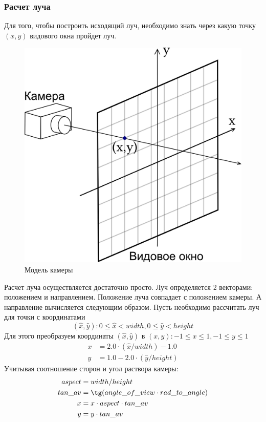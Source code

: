 \documentclass[12pt, a4paper, utf8]{article}
\begin{document}
\subsubsection{Расчет луча}

Для того, чтобы построить исходящий луч, необходимо знать через какую точку $(x,y)$ видового окна пройдет луч.

\begin{figure}[H]
\centering
\includegraphics[scale=0.75]{imgs/camera.png} 
\caption{Модель камеры}\label{fig:camera_model}
\end{figure}

Расчет луча осуществляется достаточно просто. Луч определяется 2 векторами: положением и направлением. Положение луча совпадает с положением камеры. А направление вычисляется следующим образом.
Пусть необходимо рассчитать луч для точки с координатами
$$(\hat x, \hat y) : 0 \le \hat x < width, 0 \le \hat y < height$$
Для этого преобразуем координаты $(\hat x, \hat y)$ в 
$(x, y) : -1 \le x \le 1, -1 \le y \le 1$
\begin{equation*}
\begin{split}
x &= 2.0 \cdot (\hat x / width) - 1.0{}\\
y &= 1.0 - 2.0 \cdot (\hat y / height)
\end{split}
\end{equation*}
Учитывая соотношение сторон и угол раствора камеры:
\begin{equation*}
\begin{split}
aspect &= width / height \\
tan\_av &= \tg(angle\_of\_view \cdot rad\_to\_angle) \\
x &= x \cdot aspect \cdot tan\_av \\
y &= y \cdot tan\_av
\end{split}
\end{equation*}
\end{document}
